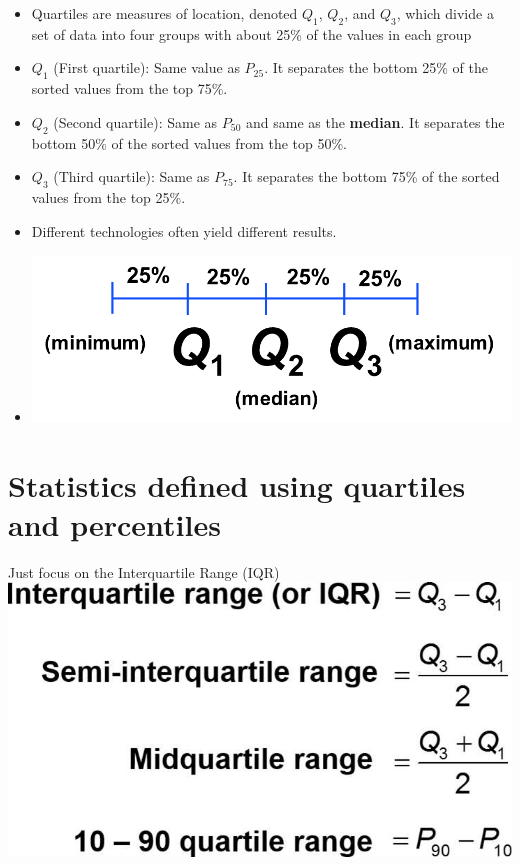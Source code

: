 \documentclass[]{book}
\providecommand{\tightlist}{%
  \setlength{\itemsep}{0pt}\setlength{\parskip}{0pt}}
\begin{document}
\begin{itemize}
\tightlist
\item
  Quartiles are measures of location, denoted \(Q_1\), \(Q_2\), and \(Q_3\), which divide a set of data into four groups with about 25\% of the values in each group
\item
  \(Q_1\) (First quartile): Same value as \(P_{25}\). It separates the bottom 25\% of the sorted values from the top 75\%.
\item
  \(Q_2\) (Second quartile): Same as \(P_{50}\) and same as the \textbf{median}. It separates the bottom 50\% of the sorted values from the top 50\%.
\item
  \(Q_3\) (Third quartile): Same as \(P_{75}\). It separates the bottom 75\% of the sorted values from the top 25\%.
\item
  Different technologies often yield different results.
\item
  \includegraphics{pic14.png}
\end{itemize}

\hypertarget{statistics-defined-using-quartiles-and-percentiles}{%
\section{Statistics defined using quartiles and percentiles}\label{statistics-defined-using-quartiles-and-percentiles}}

Just focus on the Interquartile Range (IQR)
\includegraphics{pic15.jpg}
\end{document}
